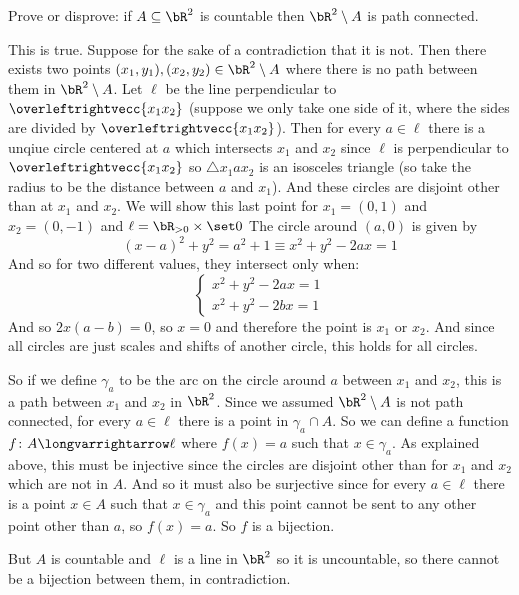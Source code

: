 \documentclass[10pt]{article}
\let\lineseg=\overleftrightvecc
\begin{document}
\begin{exercise*}

    Prove or disprove: if $A\subseteq\bR^2$ is countable then $\bR^2\setminus A$ is path connected.

\end{exercise*}

\begin{blankpp}

    This is true.
    Suppose for the sake of a contradiction that it is not.
    Then there exists two points $(x_1,y_1),(x_2,y_2)\in\bR^2\setminus A$ where there is no path
    between them in $\bR^2\setminus A$.
    Let $\ell$ be the line perpendicular to $\lineseg{x_1x_2}$ (suppose we only take one side
    of it, where the sides are divided by $\lineseg{x_1x_2}$).
    Then for every $a\in\ell$ there is a unqiue circle centered at $a$ which intersects $x_1$ and
    $x_2$ since $\ell$ is perpendicular to $\lineseg{x_1x_2}$ so $\triangle x_1ax_2$ is an
    isosceles triangle (so take the radius to be the distance between $a$ and $x_1$).
    And these circles are disjoint other than at $x_1$ and $x_2$.
    We will show this last point for $x_1=(0,1)$ and $x_2=(0,-1)$ and $\ell=\bR_{>0}\times\set 0$
    The circle around $(a,0)$ is given by
        \[ (x-a)^2 + y^2 = a^2 + 1 \equiv x^2 + y^2 - 2ax = 1 \]
    And so for two different values, they intersect only when:
        \[ \begin{cases} x^2 + y^2 - 2ax = 1 \\ x^2 + y^2 - 2bx = 1 \end{cases} \]
    And so $2x(a-b)=0$, so $x=0$ and therefore the point is $x_1$ or $x_2$.
    And since all circles are just scales and shifts of another circle, this holds for all circles.

    So if we define $\gamma_a$ to be the arc on the circle around $a$ between $x_1$ and $x_2$, this
    is a path between $x_1$ and $x_2$ in $\bR^2$.
    Since we assumed $\bR^2\setminus A$ is not path connected, for every $a\in\ell$ there is a point
    in $\gamma_a\cap A$.
    So we can define a function $f\colon A\longvarrightarrow\ell$ where $f(x)=a$ such that
    $x\in\gamma_a$.
    As explained above, this must be injective since the circles are disjoint other than for $x_1$
    and $x_2$ which are not in $A$.
    And so it must also be surjective since for every $a\in\ell$ there is a point $x\in A$ such
    that $x\in\gamma_a$ and this point cannot be sent to any other point other than $a$, so
    $f(x)=a$.
    So $f$ is a bijection.

    But $A$ is countable and $\ell$ is a line in $\bR^2$ so it is uncountable, so there cannot be a
    bijection between them, in contradiction.

\end{blankpp}
\end{document}
